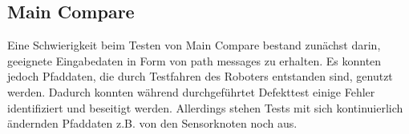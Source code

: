 \subsection{Main Compare}
Eine Schwierigkeit beim Testen von Main Compare bestand zunächst darin,
geeignete Eingabedaten in Form von path messages zu erhalten. Es konnten jedoch
Pfaddaten, die durch Testfahren des Roboters entstanden sind,
genutzt werden. Dadurch konnten während durchgeführtet Defekttest einige Fehler
identifiziert und beseitigt werden. Allerdings stehen Tests mit sich
kontinuierlich ändernden Pfaddaten z.B. von den Sensorknoten noch aus.

